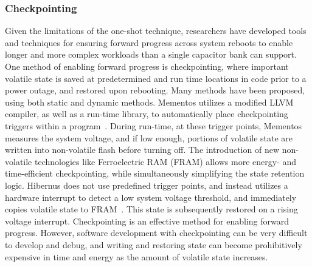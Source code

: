\subsubsection{Checkpointing}
Given the limitations of the one-shot technique, researchers have developed tools and techniques for
ensuring forward progress across system reboots to enable longer and more complex workloads than a single capacitor bank can support.
One method of enabling forward progress is checkpointing,
where important volatile state is saved at predetermined and run time locations in code prior to a power outage, and restored upon rebooting. Many methods have been proposed, using both static and dynamic methods.
Mementos utilizes a modified LLVM compiler, as well as a run-time library, to automatically place checkpointing triggers within a program~\cite{ransford2012mementos}. During run-time, at these trigger points, Mementos measures the system voltage, and if low enough, portions of volatile state are written into non-volatile flash before turning off.
The introduction of new non-volatile technologies like Ferroelectric RAM (FRAM) allows more energy- and time-efficient checkpointing, while simultaneously simplifying the state retention logic.
Hibernus does not use predefined trigger points, and instead utilizes a hardware interrupt to detect a low system voltage threshold, and immediately copies volatile state to FRAM~\cite{balsamo2014hibernus}. This state is subsequently restored on a rising voltage interrupt.
Checkpointing is an effective method for enabling forward progress. However, software development with checkpointing can be very difficult to develop and debug, and writing and restoring state can become prohibitively expensive in time and energy as the amount of volatile state increases.

